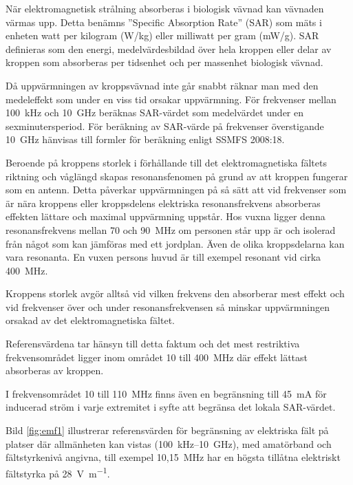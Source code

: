 När elektromagnetisk strålning absorberas i biologisk vävnad kan vävnaden värmas
upp.
Detta benämns ''Specific Absorption Rate'' (SAR) som mäts i enheten watt per
kilogram (W/kg) eller milliwatt per gram (mW/g).
SAR definieras som den energi, medelvärdesbildad över hela kroppen eller delar
av kroppen som absorberas per tidsenhet och per massenhet biologisk vävnad.

Då uppvärmningen av kroppsvävnad inte går snabbt räknar man med den medeleffekt
som under en viss tid orsakar uppvärmning.
För frekvenser mellan \SI{100}{\kilo\hertz} och \SI{10}{\giga\hertz} beräknas
SAR-värdet som medelvärdet under en sexminutersperiod.
För beräkning av SAR-värde på frekvenser överstigande \SI{10}{\giga\hertz}
hänvisas till formler för beräkning enligt SSMFS 2008:18.

Beroende på kroppens storlek i förhållande till det elektromagnetiska fältets
riktning och våglängd skapas resonansfenomen på grund av att kroppen fungerar
som en antenn.
Detta påverkar uppvärmningen på så sätt att vid frekvenser som är nära kroppens
eller kroppsdelens elektriska resonansfrekvens absorberas effekten lättare och
maximal uppvärmning uppstår.
Hos vuxna ligger denna resonansfrekvens mellan 70 och \SI{90}{\mega\hertz} om
personen står upp är och isolerad från något som kan jämföras med ett jordplan.
Även de olika kroppsdelarna kan vara resonanta.
En vuxen persons huvud är till exempel resonant vid cirka \SI{400}{\mega\hertz}.

Kroppens storlek avgör alltså vid vilken frekvens den absorberar mest effekt och
vid frekvenser över och under resonansfrekvensen så minskar uppvärmningen
orsakad av det elektromagnetiska fältet.

Referensvärdena tar hänsyn till detta faktum och det mest restriktiva
frekvensområdet ligger inom området 10 till 400~MHz där effekt lättast
absorberas av kroppen.

I frekvensområdet 10 till 110~MHz finns även en begränsning till 45~mA för
inducerad ström i varje extremitet i syfte att begränsa det lokala SAR-värdet.


Bild \ref{fig:emf1} illustrerar referensvärden för begränsning av elektriska
fält på platser där allmänheten kan vistas (100~kHz--10~GHz), med amatörband
och fältstyrkenivå angivna, till exempel 10,15~MHz har en högsta tillåtna
elektriskt fältstyrka på \SI{28}{\volt\per\metre}.

